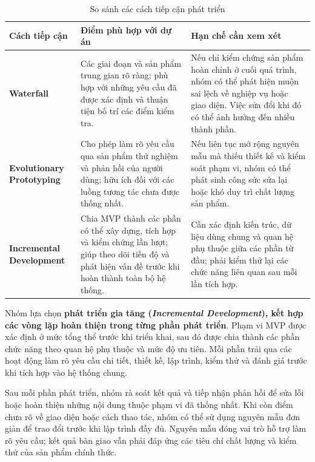 \begin{table}[H]
\centering
\renewcommand{\arraystretch}{1.2}
\begin{tabularx}{\textwidth}{|p{3.3cm}|X|X|}
\hline
\textbf{Cách tiếp cận} & \textbf{Điểm phù hợp với dự án} & \textbf{Hạn chế cần xem xét} \\
\hline
\textbf{Waterfall} & Các giai đoạn và sản phẩm trung gian rõ ràng; phù hợp với những yêu cầu đã được xác định và thuận tiện bố trí các điểm kiểm tra. & Nếu chỉ kiểm chứng sản phẩm hoàn chỉnh ở cuối quá trình, nhóm có thể phát hiện muộn sai lệch về nghiệp vụ hoặc giao diện. Việc sửa đổi khi đó có thể ảnh hưởng đến nhiều thành phần. \\
\hline
\textbf{Evolutionary Prototyping} & Cho phép làm rõ yêu cầu qua sản phẩm thử nghiệm và phản hồi của người dùng; hữu ích đối với các luồng tương tác chưa được thống nhất. & Nếu liên tục mở rộng nguyên mẫu mà thiếu thiết kế và kiểm soát phạm vi, nhóm có thể phát sinh công sức sửa lại hoặc khó duy trì chất lượng sản phẩm. \\
\hline
\textbf{Incremental Development} & Chia MVP thành các phần có thể xây dựng, tích hợp và kiểm chứng lần lượt; giúp theo dõi tiến độ và phát hiện vấn đề trước khi hoàn thành toàn bộ hệ thống. & Cần xác định kiến trúc, dữ liệu dùng chung và quan hệ phụ thuộc giữa các phần từ đầu; phải kiểm thử lại các chức năng liên quan sau mỗi lần tích hợp. \\
\hline
\end{tabularx}
\caption{So sánh các cách tiếp cận phát triển}
\label{tab:development-approach-comparison}
\end{table}


Nhóm lựa chọn \textbf{phát triển gia tăng (\textit{Incremental Development}), kết hợp các vòng lặp hoàn thiện trong từng phần phát triển}. Phạm vi MVP được xác định ở mức tổng thể trước khi triển khai, sau đó được chia thành các phần chức năng theo quan hệ phụ thuộc và mức độ ưu tiên. Mỗi phần trải qua các hoạt động làm rõ yêu cầu chi tiết, thiết kế, lập trình, kiểm thử và đánh giá trước khi tích hợp vào hệ thống chung.

Sau mỗi phần phát triển, nhóm rà soát kết quả và tiếp nhận phản hồi để sửa lỗi hoặc hoàn thiện những nội dung thuộc phạm vi đã thống nhất. Khi còn điểm chưa rõ về giao diện hoặc cách thao tác, nhóm có thể sử dụng nguyên mẫu đơn giản để trao đổi trước khi lập trình đầy đủ. Nguyên mẫu đóng vai trò hỗ trợ làm rõ yêu cầu; kết quả bàn giao vẫn phải đáp ứng các tiêu chí chất lượng và kiểm thử của sản phẩm chính thức.

